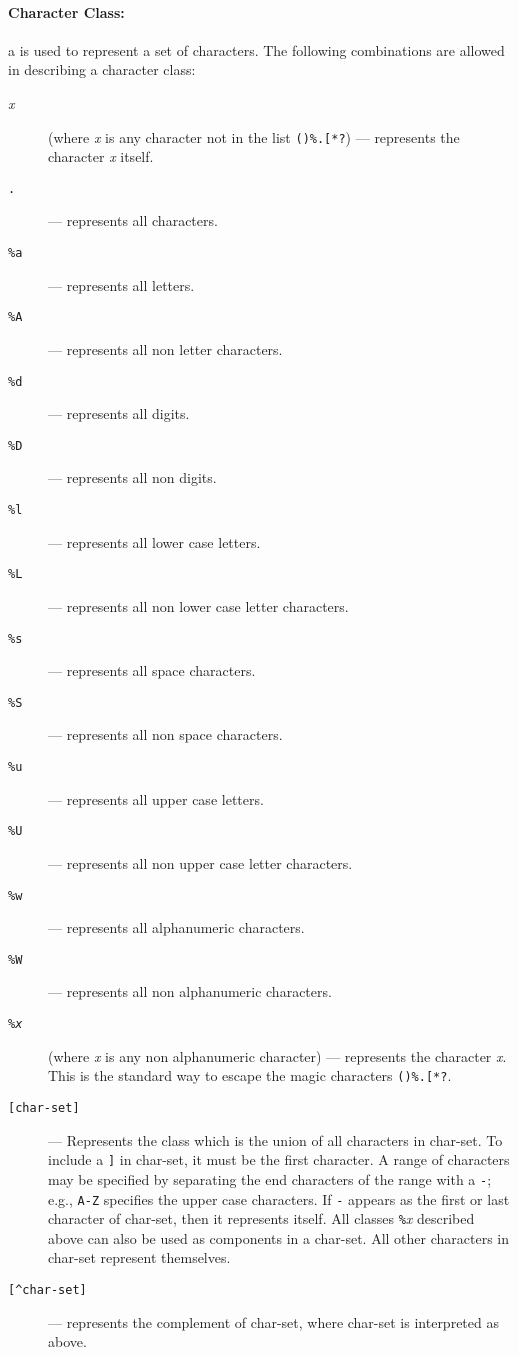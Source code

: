 \paragraph{Character Class:}
a  is used to represent a set of characters.
The following combinations are allowed in describing a character class:
\begin{description}
\item[{\em x}] (where {\em x} is any character not in the list \verb'()%.[*?')
--- represents the character {\em x} itself.
\item[{\tt .}] --- represents all characters.
\item[{\tt \%a}] --- represents all letters.
\item[{\tt \%A}] --- represents all non letter characters.
\item[{\tt \%d}] --- represents all digits.
\item[{\tt \%D}] --- represents all non digits.
\item[{\tt \%l}] --- represents all lower case letters.
\item[{\tt \%L}] --- represents all non lower case letter characters.
\item[{\tt \%s}] --- represents all space characters.
\item[{\tt \%S}] --- represents all non space characters.
\item[{\tt \%u}] --- represents all upper case letters.
\item[{\tt \%U}] --- represents all non upper case letter characters.
\item[{\tt \%w}] --- represents all alphanumeric characters.
\item[{\tt \%W}] --- represents all non alphanumeric characters.
\item[{\tt \%\em x}] (where {\em x} is any non alphanumeric character)  ---
represents the character {\em x}.
This is the standard way to escape the magic characters \verb'()%.[*?'.
\item[{\tt [char-set]}] --- 
Represents the class which is the union of all
characters in char-set.
To include a \verb']' in char-set, it must be the first character.
A range of characters may be specified by
separating the end characters of the range with a \verb'-';
e.g., \verb'A-Z' specifies the upper case characters.
If \verb'-' appears as the first or last character of char-set,
then it represents itself.
All classes \verb'%'{\em x} described above can also be used as
components in a char-set.
All other characters in char-set represent themselves.
\item[{\tt [\^{ }char-set]}] ---
represents the complement of char-set,
where char-set is interpreted as above.
\end{description}

